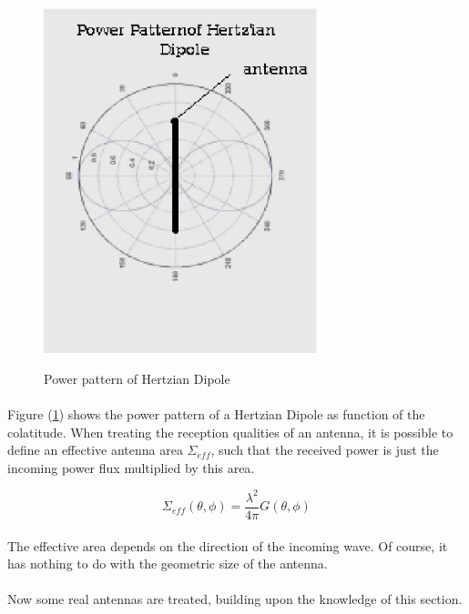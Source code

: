 \documentclass[a4paper,10pt]{thesis}
\begin{document}
\begin{figure}
\begin{center}
  \includegraphics[width=8cm]{pp_hd}\\
  \caption{Power pattern of Hertzian Dipole}\label{fig_pp_hd}
\end{center}
\end{figure}


\paragraph*{}
Figure (\ref{fig_pp_hd}) shows the power pattern of a Hertzian Dipole as function of the colatitude. When treating the reception qualities of an antenna, it is possible to define an effective antenna area $\Sigma_{eff}$, such that the received power is just the incoming power flux multiplied by this area.

\begin{equation}\label{effect_area}
\Sigma_{eff}(\theta,\phi)=\frac{\lambda^2}{4\pi}G(\theta,\phi)
\end{equation}

\paragraph*{}
The effective area depends on the direction of the incoming wave. Of course, it has nothing to do with the geometric size of the antenna.

\paragraph*{}
Now some real antennas are treated, building upon the knowledge of this section.
\newpage
\end{document}
